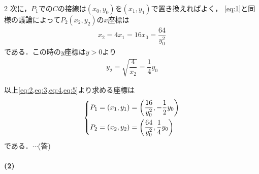 \documentclass[../../main.tex]{subfiles}
\begin{document}
\begin{multicols}{2}
  次に，$P_1$での$C$の接線は$(x_0,y_0)$を$(x_1,y_1)$で置き換えればよく，
  \cref{eq:1}と同様の議論によって$P_2(x_2,y_2)$の$x$座標は
  \begin{align}
    x_2 = 4x_1 = 16 x_0 = \dfrac{64}{y^2_0}\label{eq:4}
  \end{align}
  である．この時の$y$座標は$y>0$より
  \begin{align}
    y_2 = \sqrt{\dfrac{4}{x_2}} = \dfrac{1}{4}y_0 \label{eq:5}
  \end{align}

  以上\cref{eq:2,eq:3,eq:4,eq:5}より求める座標は
  \begin{align}
    \begin{dcases}
      P_1 = (x_1,y_1) = \left(\dfrac{16}{y^2_0},-\dfrac{1}{2}y_0\right) \\
      P_2 = (x_2,y_2) = \left(\dfrac{64}{y^2_0},\dfrac{1}{4}y_0\right)
    \end{dcases}
  \end{align}
  である．$\cdots$(答)

  \paragraph{(2)}

  \begin{figure}[H]
    \centering
\end{figure}
\end{multicols}
\end{document}
